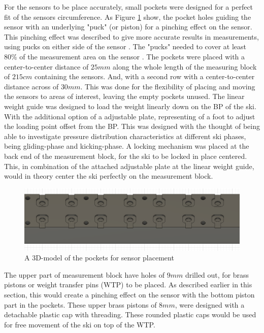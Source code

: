 For the sensors to be place accurately, small pockets were designed for a perfect fit of the sensors circumference. As Figure \ref{fig:3dpockets} show, the pocket holes guiding the sensor with an underlying "puck" (or piston) for a pinching effect on the sensor. This pinching effect was described to give more accurate results in measurements, using pucks on either side of the sensor \citep{vecchi_experimental_2000}. The "pucks" needed to cover at least $80\%$ of the measurement area on the sensor \citep{tekscanA201}. The pockets were placed with a center-to-center distance of $25mm$ along the whole length of the measuring block of $215cm$ containing the sensors. And, with a second row with a center-to-center distance across of $30mm$. This was done for the flexibility of placing and moving the sensors to areas of interest, leaving the empty pockets unused. The linear weight guide was designed to load the weight linearly down on the BP of the ski. With the additional option of a adjustable plate, representing of a foot to adjust the loading point offset from the BP. This was designed with the thought of being able to investigate pressure distribution characteristics at different ski phases, being gliding-phase and kicking-phase.
A locking mechanism was placed at the back end of the measurement block, for the ski to be locked in place centered. This, in combination of the attached adjustable plate at the linear weight guide, would in theory center the ski perfectly on the measurement block. 
\begin{figure}
    \centering
    \includegraphics[scale=0.3]{figures/pockets.png}
    \caption{A 3D-model of the pockets for sensor placement}
    \label{fig:3dpockets}
\end{figure}

The upper part of measurement block have holes of $9mm$ drilled out, for brass pistons or weight transfer pins (WTP) to be placed. As described earlier in this section, this would create a pinching effect on the sensor with the bottom piston part in the pockets. These upper brass pistons of $8mm$, were designed with a detachable plastic cap with threading. These rounded plastic caps would be used for free movement of the ski on top of the WTP.

